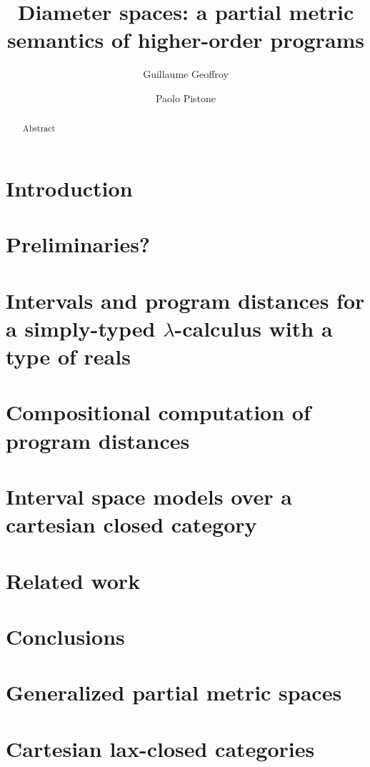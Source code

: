\documentclass[a4paper,UKenglish,cleveref, autoref, english, thm-restate]{lipics-v2019}
\title{Diameter spaces: a partial metric semantics of higher-order programs} %
\author{Guillaume Geoffroy}
{Universit\`a di Bologna, Dipartimento Informatica-Scienza e Ingegneria, Italy}
{guillaume.geoffroy@unibo.it} 
{}
{}
\author{Paolo Pistone}
{Universit\`a di Bologna, Dipartimento Informatica-Scienza e Ingegneria, Italy}
{paolo.pistone2@unibo.it} 
{}
{}
\begin{document}
\maketitle

\begin{abstract}
Abstract
\end{abstract}


\section{Introduction}




\section{Preliminaries?}



\section{Intervals and program distances for a simply-typed $\lambda$-calculus with a type of reals}
\label{section:stlc}



\section{Compositional computation of program distances}



\section{Interval space models over a cartesian closed category}



\section{Related work}



\section{Conclusions}






\appendix

\section{Generalized partial metric spaces}



\section{Cartesian lax-closed categories}


\end{document}
